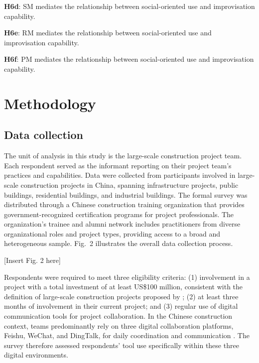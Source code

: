 \documentclass[authoryear,preprint,review,times,10pt]{elsarticle}
\begin{document}
\textbf{H6d}: SM mediates the relationship between social-oriented use and improvisation capability.

\textbf{H6e}: RM mediates the relationship between social-oriented use and improvisation capability.

\textbf{H6f}: PM mediates the relationship between social-oriented use and improvisation capability.

\section{Methodology}
\subsection{Data collection}
The unit of analysis in this study is the large-scale construction project team. Each respondent served as the informant reporting on their project team's practices and capabilities. Data were collected from participants involved in large-scale construction projects in China, spanning infrastructure projects, public buildings, residential buildings, and industrial buildings. The formal survey was distributed through a Chinese construction training organization that provides government-recognized certification programs for project professionals. The organization's trainee and alumni network includes practitioners from diverse organizational roles and project types, providing access to a broad and heterogeneous sample. Fig.~2 illustrates the overall data collection process. 

\begin{center}[Insert Fig. 2 here]\end{center}

Respondents were required to meet three eligibility criteria: (1) involvement in a project with a total investment of at least US\$100 million, consistent with the definition of large-scale construction projects proposed by \citet{harrison2024Scale}; (2) at least three months of involvement in their current project; and (3) regular use of digital communication tools for project collaboration. In the Chinese construction context, teams predominantly rely on three digital collaboration platforms, Feishu, WeChat, and DingTalk, for daily coordination and communication \citep{zhu2023Dynamics, jia2025Knowledge}. The survey therefore assessed respondents' tool use specifically within these three digital environments.
\end{document}
